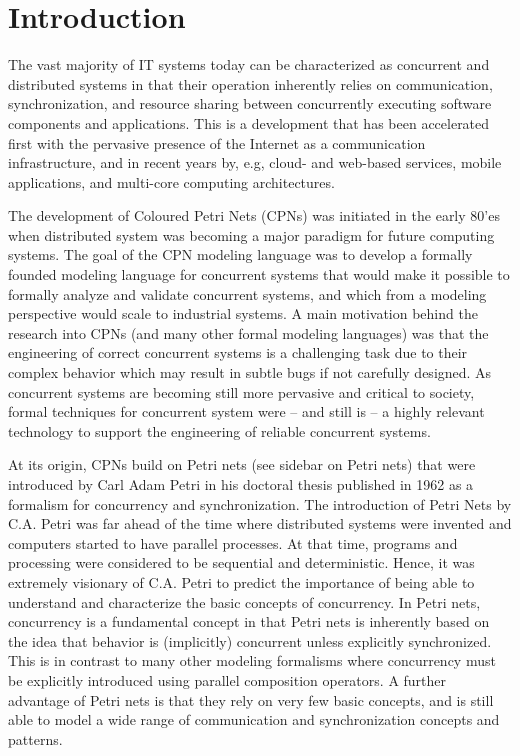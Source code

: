 \section{Introduction}

The vast majority of IT systems today can be characterized as
concurrent and distributed systems in that their operation inherently
relies on communication, synchronization, and resource sharing between
concurrently executing software components and applications. This is a
development that has been accelerated first with the pervasive
presence of the Internet as a communication infrastructure, and in
recent years by, e.g, cloud- and web-based services, mobile
applications, and multi-core computing architectures.


The development of Coloured Petri Nets (CPNs) was initiated in the
early 80'es when distributed system was becoming a major paradigm for
future computing systems. The goal of the CPN modeling language was to
develop a formally founded modeling language for concurrent systems
that would make it possible to formally analyze and validate
concurrent systems, and which from a modeling perspective would scale
to industrial systems. A main motivation behind the research into CPNs
(and many other formal modeling languages) was that the engineering of
correct concurrent systems is a challenging task due to their complex
behavior which may result in subtle bugs if not carefully designed. As
concurrent systems are becoming still more pervasive and critical to
society, formal techniques for concurrent system were -- and still is
-- a highly relevant technology to support the engineering of reliable
concurrent systems.


At its origin, CPNs build on Petri nets (see sidebar on Petri nets)
that were introduced by Carl Adam Petri in his doctoral thesis
published in 1962 \cite{capetri:thesis} as a formalism for concurrency
and synchronization. The introduction of Petri Nets by C.A. Petri was
far ahead of the time where distributed systems were invented and
computers started to have parallel processes. At that time, programs
and processing were considered to be sequential and
deterministic. Hence, it was extremely visionary of C.A. Petri to
predict the importance of being able to understand and characterize
the basic concepts of concurrency. In Petri nets, concurrency is a
fundamental concept in that Petri nets is inherently based on the idea
that behavior is (implicitly) concurrent unless explicitly
synchronized. This is in contrast to many other modeling formalisms
where concurrency must be explicitly introduced using parallel
composition operators. A further advantage of Petri nets is that they
rely on very few basic concepts, and is still able to model a wide
range of communication and synchronization concepts and patterns.\\

